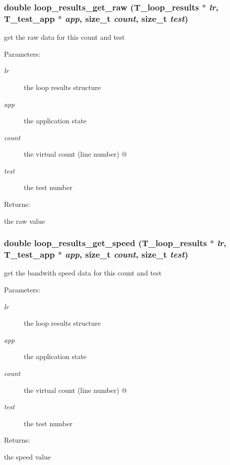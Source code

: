 \subsubsection{\setlength{\rightskip}{0pt plus 5cm}double loop\_\-results\_\-get\_\-raw ({\bf T\_\-loop\_\-results} $\ast$ {\em lr}, {\bf T\_\-test\_\-app} $\ast$ {\em app}, size\_\-t {\em count}, size\_\-t {\em test})}\label{group__loop__test_a8}


get the raw data for this count and test \begin{Desc}
\item[Parameters: ]\par
\begin{description}
\item[{\em 
lr}]the loop results structure \item[{\em 
app}]the application state \item[{\em 
count}]the virtual count (line number) @ \item[{\em 
test}]the test number \end{description}
\end{Desc}
\begin{Desc}
\item[Returns: ]\par
the raw value \end{Desc}
\subsubsection{\setlength{\rightskip}{0pt plus 5cm}double loop\_\-results\_\-get\_\-speed ({\bf T\_\-loop\_\-results} $\ast$ {\em lr}, {\bf T\_\-test\_\-app} $\ast$ {\em app}, size\_\-t {\em count}, size\_\-t {\em test})}\label{group__loop__test_a14}


get the bandwith speed data for this count and test \begin{Desc}
\item[Parameters: ]\par
\begin{description}
\item[{\em 
lr}]the loop results structure \item[{\em 
app}]the application state \item[{\em 
count}]the virtual count (line number) @ \item[{\em 
test}]the test number \end{description}
\end{Desc}
\begin{Desc}
\item[Returns: ]\par
the speed value \end{Desc}
